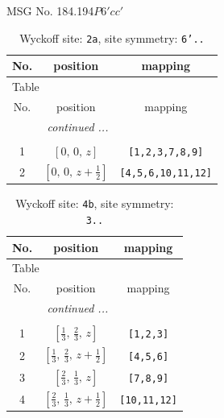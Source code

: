 \documentclass[fleqn,8pt]{jsarticle}
\begin{document}
\setcounter{MaxMatrixCols}{32}

\renewcommand{\tablename}{Table~}
\renewcommand{\figurename}{Figure~}
\begin{center}
\LARGE
MSG No. 184.194\quad$P6'cc'$
\end{center}
\renewcommand{\arraystretch}{1.2}
\begin{longtable}{ccc}
\caption{Wyckoff site: {\tt 2a}, site symmetry: {\tt 6'..}}
 \\
 \hline \hline
No. & position & mapping \\ \hline \endfirsthead

\multicolumn{2}{l}{\tablename\ \thetable{}} \\
 \hline \hline
No. & position & mapping \\ \hline \endhead

 \hline \hline
\multicolumn{2}{r}{\footnotesize\it continued ...} \\ \endfoot

 \hline \hline
\multicolumn{2}{r}{} \\ \endlastfoot

1 & $\left[ 0,\, 0,\, z \right]$ & {\tt [1,2,3,7,8,9]} \\ \hline
2 & $\left[ 0,\, 0,\, z + \frac{1}{2} \right]$ & {\tt [4,5,6,10,11,12]} \\
\end{longtable}
\renewcommand{\arraystretch}{1.2}
\begin{longtable}{ccc}
\caption{Wyckoff site: {\tt 4b}, site symmetry: {\tt 3..}}
 \\
 \hline \hline
No. & position & mapping \\ \hline \endfirsthead

\multicolumn{2}{l}{\tablename\ \thetable{}} \\
 \hline \hline
No. & position & mapping \\ \hline \endhead

 \hline \hline
\multicolumn{2}{r}{\footnotesize\it continued ...} \\ \endfoot

 \hline \hline
\multicolumn{2}{r}{} \\ \endlastfoot

1 & $\left[ \frac{1}{3},\, \frac{2}{3},\, z \right]$ & {\tt [1,2,3]} \\ \hline
2 & $\left[ \frac{1}{3},\, \frac{2}{3},\, z + \frac{1}{2} \right]$ & {\tt [4,5,6]} \\ \hline
3 & $\left[ \frac{2}{3},\, \frac{1}{3},\, z \right]$ & {\tt [7,8,9]} \\ \hline
4 & $\left[ \frac{2}{3},\, \frac{1}{3},\, z + \frac{1}{2} \right]$ & {\tt [10,11,12]} \\
\end{longtable}
\end{document}
